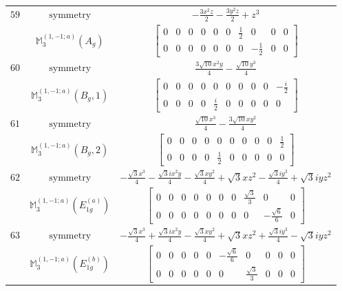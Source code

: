 \documentclass[fleqn,8pt,landscape]{jsarticle}
\begin{document}
\begin{longtable}{ccc}
$ 59 $ & $ \text{symmetry} $ & $ - \frac{3 x^{2} z}{2} - \frac{3 y^{2} z}{2} + z^{3} $ \\
$  $ & $ \mathbb{M}_{3}^{(1,-1;a)}(A_{g}) $ & $ \begin{bmatrix} 0 & 0 & 0 & 0 & 0 & 0 & \frac{1}{2} & 0 & 0 & 0 \\ 0 & 0 & 0 & 0 & 0 & 0 & 0 & - \frac{1}{2} & 0 & 0 \end{bmatrix} $ \\ \hline
$ 60 $ & $ \text{symmetry} $ & $ \frac{3 \sqrt{10} x^{2} y}{4} - \frac{\sqrt{10} y^{3}}{4} $ \\
$  $ & $ \mathbb{M}_{3}^{(1,-1;a)}(B_{g},1) $ & $ \begin{bmatrix} 0 & 0 & 0 & 0 & 0 & 0 & 0 & 0 & 0 & - \frac{i}{2} \\ 0 & 0 & 0 & 0 & \frac{i}{2} & 0 & 0 & 0 & 0 & 0 \end{bmatrix} $ \\ \hline
$ 61 $ & $ \text{symmetry} $ & $ \frac{\sqrt{10} x^{3}}{4} - \frac{3 \sqrt{10} x y^{2}}{4} $ \\
$  $ & $ \mathbb{M}_{3}^{(1,-1;a)}(B_{g},2) $ & $ \begin{bmatrix} 0 & 0 & 0 & 0 & 0 & 0 & 0 & 0 & 0 & \frac{1}{2} \\ 0 & 0 & 0 & 0 & \frac{1}{2} & 0 & 0 & 0 & 0 & 0 \end{bmatrix} $ \\ \hline
$ 62 $ & $ \text{symmetry} $ & $ - \frac{\sqrt{3} x^{3}}{4} - \frac{\sqrt{3} i x^{2} y}{4} - \frac{\sqrt{3} x y^{2}}{4} + \sqrt{3} x z^{2} - \frac{\sqrt{3} i y^{3}}{4} + \sqrt{3} i y z^{2} $ \\
$  $ & $ \mathbb{M}_{3}^{(1,-1;a)}(E_{1g}^{(a)}) $ & $ \begin{bmatrix} 0 & 0 & 0 & 0 & 0 & 0 & 0 & \frac{\sqrt{3}}{3} & 0 & 0 \\ 0 & 0 & 0 & 0 & 0 & 0 & 0 & 0 & - \frac{\sqrt{6}}{6} & 0 \end{bmatrix} $ \\ \hline
$ 63 $ & $ \text{symmetry} $ & $ - \frac{\sqrt{3} x^{3}}{4} + \frac{\sqrt{3} i x^{2} y}{4} - \frac{\sqrt{3} x y^{2}}{4} + \sqrt{3} x z^{2} + \frac{\sqrt{3} i y^{3}}{4} - \sqrt{3} i y z^{2} $ \\
$  $ & $ \mathbb{M}_{3}^{(1,-1;a)}(E_{1g}^{(b)}) $ & $ \begin{bmatrix} 0 & 0 & 0 & 0 & 0 & - \frac{\sqrt{6}}{6} & 0 & 0 & 0 & 0 \\ 0 & 0 & 0 & 0 & 0 & 0 & \frac{\sqrt{3}}{3} & 0 & 0 & 0 \end{bmatrix} $ \\ \hline

\end{longtable}
\end{document}
